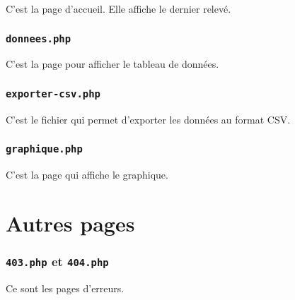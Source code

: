 C'est la page d'accueil. Elle affiche le dernier relevé.

\cprotect\subsubsection{\verb-donnees.php-}

C'est la page pour afficher le tableau de données.

\cprotect\subsubsection{\verb/exporter-csv.php/}

C'est le fichier qui permet d'exporter les données au format CSV.

\cprotect\subsubsection{\verb-graphique.php-}

C'est la page qui affiche le graphique.

\section{Autres pages}

\cprotect\subsubsection{\verb-403.php- et \verb-404.php-}

Ce sont les pages d'erreurs.
